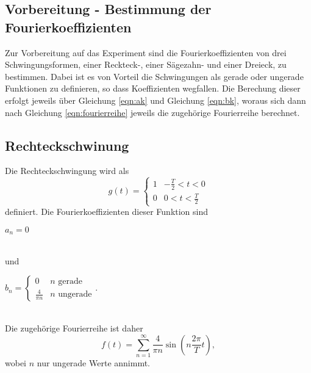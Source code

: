 \subsection{Vorbereitung - Bestimmung der Fourierkoeffizienten}
\label{sec:vorbereitung}
Zur Vorbereitung auf das Experiment sind die Fourierkoeffizienten von drei Schwingungsformen, einer Reckteck-, einer Sägezahn-
und einer Dreieck, zu bestimmen. Dabei ist es von Vorteil die Schwingungen als gerade oder ungerade Funktionen zu definieren, so 
dass Koeffizienten wegfallen. Die Berechung dieser erfolgt jeweils über Gleichung \eqref{eqn:ak} und Gleichung \eqref{eqn:bk},
woraus sich dann nach Gleichung \eqref{eqn:fourierreihe} jeweils die zugehörige Fourierreihe berechnet.
    \subsection{Rechteckschwinung}
    Die Rechteckschwingung wird als
    \begin{equation}
    \label{eqn:rechteck}
    g(t) = \begin{cases}
                1 & -\frac{T}{2} < t < 0 \\
                0 & 0 < t < \frac{T}{2} 
            \end{cases}
    \end{equation}        
    definiert. Die Fourierkoeffizienten dieser Funktion sind
    \\
    \centerline{$a_n = 0$} 
    \\
    und
    \\ 
    \centerline{$b_n = \begin{cases}
                            0 & n \text{ gerade} \\
                            \frac{4}{\pi n } & n \text{ ungerade}
                        \end{cases}$.}
                        \\
    Die zugehörige Fourierreihe ist daher
    \begin{equation}
    \label{eqn:fourierrechteck}
    f(t) = \sum_{n=1}^{\infty}  \frac{4}{\pi n } \sin(n \frac{2 \pi}{T} t),
    \end{equation}
    wobei $n$ nur ungerade Werte annimmt.

